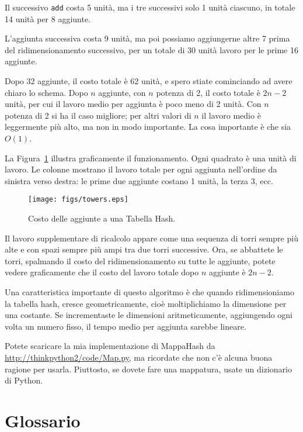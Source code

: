 \documentclass[10pt]{book}
\begin{document}
Il successivo {\tt add} costa 5 unità, ma i tre successivi solo 1 unità ciascuno, in totale 14 unità per 8 aggiunte.

L'aggiunta successiva costa 9 unità, ma poi possiamo aggiungerne altre 7 prima del ridimensionamento successivo, per un totale di 30 unità lavoro per le prime 16 aggiunte.

Dopo 32 aggiunte, il costo totale è 62 unità, e spero stiate cominciando ad avere chiaro lo schema. Dopo $n$ aggiunte, con $n$ potenza di 2, il costo totale è $2n-2$ unità, per cui il lavoro medio per aggiunta è poco meno di 2 unità. Con $n$ potenza di 2 si ha il caso migliore; per altri valori di $n$ il lavoro medio è leggermente più alto, ma non in modo importante. La cosa importante è che sia
$O(1)$.

La Figura~\ref{fig.hash} illustra graficamente il funzionamento. Ogni quadrato è una unità di lavoro. Le colonne mostrano il lavoro totale per ogni aggiunta nell'ordine da sinistra verso destra: le prime due aggiunte costano 1 unità, la terza 3, ecc.

\begin{figure}
\centerline{\texttt{[image: figs/towers.eps]}}
\caption{Costo delle aggiunte a una Tabella Hash.\label{fig.hash}}
\end{figure}

Il lavoro supplementare di ricalcolo appare come una sequenza di torri sempre più alte e con spazi sempre più ampi tra due torri successive. Ora, se abbattete le torri, spalmando il costo del ridimensionamento su tutte le aggiunte, potete vedere graficamente che il costo del lavoro totale dopo $n$ aggiunte è $2n - 2$.

Una caratteristica importante di questo algoritmo è che quando ridimensioniamo la tabella hash, cresce geometricamente, cioè moltiplichiamo la dimensione per una costante. Se incrementaste le dimensioni aritmeticamente, aggiungendo ogni volta un numero fisso, il tempo medio per aggiunta sarebbe lineare.

Potete scaricare la mia implementazione di MappaHash da
\url{http://thinkpython2/code/Map.py}, ma ricordate che non c'è alcuna buona ragione per usarla. Piuttosto, se dovete fare una mappatura, usate un dizionario di Python.

\section{Glossario}
\end{document}
